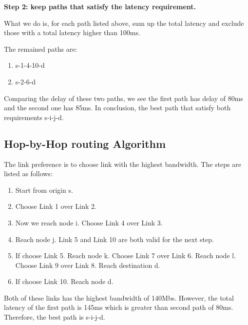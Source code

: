 \textbf{Step 2: keep paths that satisfy the latency requirement.}

What we do is, for each path listed above, sum up the total latency and exclude those with a total latency higher than 100ms.

The remained paths are:
\begin{enumerate}
\item s-1-4-10-d
\item s-2-6-d
\end{enumerate}

Comparing the delay of these two paths, we see the first path has delay of 80ms and the second one has 85ms. In conclusion, the best path that satisfy both requirements s-i-j-d.


\subsection{Hop-by-Hop routing Algorithm}

The link preference is to choose link with the highest bandwidth. The steps are listed as follows:

\begin{enumerate}
\item Start from origin s.
\item Choose Link 1 over Link 2.
\item Now we reach node i. Choose Link 4 over Link 3.
\item Reach node j.  Link 5 and Link 10 are both valid for the next step.
\item If choose Link 5. Reach node k. Choose Link 7 over Link 6. Reach node l. Choose Link 9 over Link 8. Reach destination d.
\item If choose Link 10. Reach node d.
\end{enumerate}

 Both of these links has the highest bandwidth of 140Mbs. However, the total latency of the first path is 145ms which is greater than second path of 80ms. Therefore, the best path is s-i-j-d.











